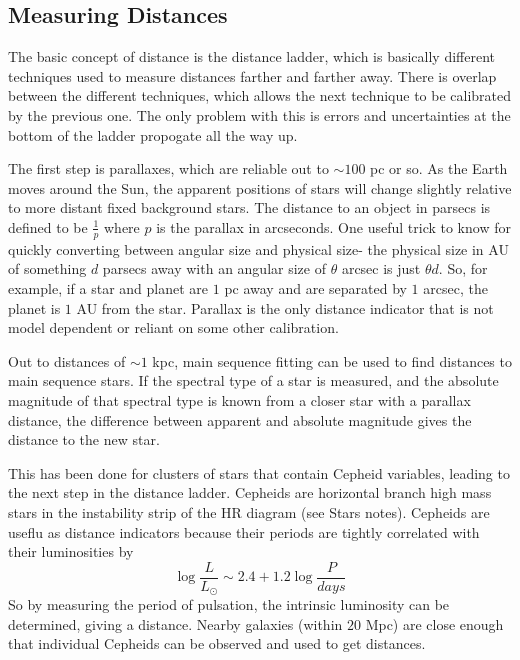 \subsection{Measuring Distances}\label{sec:distance_ladder}
The basic concept of distance is the distance ladder, which is basically 
different techniques used to measure distances farther and farther away.  
There is overlap between the different techniques, which allows the next 
technique to be calibrated by the previous one.  The only problem with this 
is errors and uncertainties at the bottom of the ladder propogate all the 
way up.  

The first step is parallaxes, which are reliable out to $\sim100$ pc or so.  As 
the Earth moves around the Sun, the apparent positions of stars will change 
slightly relative to more distant fixed background stars.  The distance 
to an object in parsecs is defined to be $\frac{1}{p}$ where $p$ is the 
parallax in arcseconds.  One useful trick to know for quickly converting 
between angular size and physical size- the physical size in AU of something 
$d$ parsecs away with an angular size of $\theta$ arcsec is just $\theta d$.  
So, for example, if a star and planet are $1$ pc away and are separated by 
$1$ arcsec, the planet is $1$ AU from the star.  Parallax is the only 
distance indicator that is not model dependent or reliant on some other 
calibration.  

Out to distances of $\sim1$ kpc, main sequence fitting can be used to find 
distances to main sequence stars.  If the spectral type of a star is measured, 
and the absolute magnitude of that spectral type is known from a closer 
star with a parallax distance, the difference between apparent and absolute 
magnitude gives the distance to the new star.  

This has been done for clusters of stars that contain Cepheid variables, 
leading to the next step in the distance ladder.  Cepheids are horizontal 
branch high mass stars in the instability strip of the HR diagram (see Stars 
notes).  Cepheids are useflu as distance indicators because their periods 
are tightly correlated with their luminosities by 
\begin{equation}
\log{\frac{L}{L_{\odot}}}\sim2.4+1.2\log{\frac{P}{days}}
\end{equation}
So by measuring the period of pulsation, the intrinsic luminosity can be 
determined, giving a distance.  Nearby galaxies (within $20$ Mpc) are close 
enough that individual Cepheids can be observed and used to get distances.  

